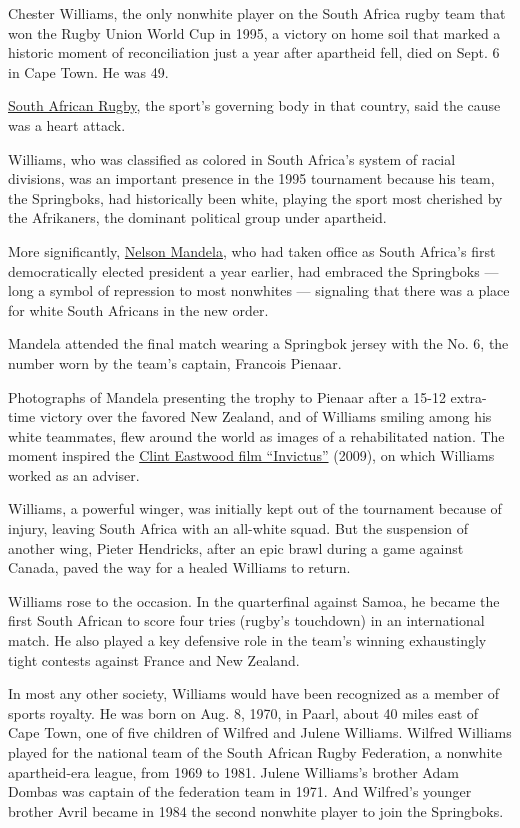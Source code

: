 Chester Williams, the only nonwhite player on the South Africa rugby
team that won the Rugby Union World Cup in 1995, a victory on home soil
that marked a historic moment of reconciliation just a year after
apartheid fell, died on Sept. 6 in Cape Town. He was 49.

\href{https://www.sarugby.co.za/}{South African Rugby}, the sport's
governing body in that country, said the cause was a heart attack.

Williams, who was classified as colored in South Africa's system of
racial divisions, was an important presence in the 1995 tournament
because his team, the Springboks, had historically been white, playing
the sport most cherished by the Afrikaners, the dominant political group
under apartheid.

More significantly,
\href{https://www.nytimes3xbfgragh.onion/2013/12/06/world/africa/nelson-mandela_obit.html}{Nelson
Mandela,} who had taken office as South Africa's first democratically
elected president a year earlier, had embraced the Springboks --- long a
symbol of repression to most nonwhites --- signaling that there was a
place for white South Africans in the new order.

Mandela attended the final match wearing a Springbok jersey with the No.
6, the number worn by the team's captain, Francois Pienaar.

Photographs of Mandela presenting the trophy to Pienaar after a 15-12
extra-time victory over the favored New Zealand, and of Williams smiling
among his white teammates, flew around the world as images of a
rehabilitated nation. The moment inspired the
\href{https://www.nytimes3xbfgragh.onion/2009/12/06/movies/06invictus.html}{Clint
Eastwood film ``Invictus''} (2009), on which Williams worked as an
adviser.

Williams, a powerful winger, was initially kept out of the tournament
because of injury, leaving South Africa with an all-white squad. But the
suspension of another wing, Pieter Hendricks, after an epic brawl during
a game against Canada, paved the way for a healed Williams to return.

Williams rose to the occasion. In the quarterfinal against Samoa, he
became the first South African to score four tries (rugby's touchdown)
in an international match. He also played a key defensive role in the
team's winning exhaustingly tight contests against France and New
Zealand.

In most any other society, Williams would have been recognized as a
member of sports royalty. He was born on Aug. 8, 1970, in Paarl, about
40 miles east of Cape Town, one of five children of Wilfred and Julene
Williams. Wilfred Williams played for the national team of the South
African Rugby Federation, a nonwhite apartheid-era league, from 1969 to
1981. Julene Williams's brother Adam Dombas was captain of the
federation team in 1971. And Wilfred's younger brother Avril became in
1984 the second nonwhite player to join the Springboks.

